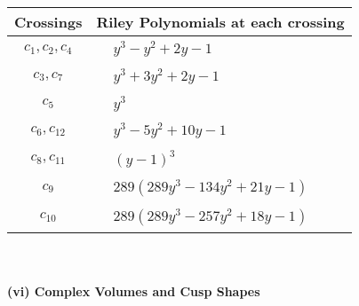 \documentclass[1p]{elsarticle_modified}
\theoremstyle{definition}
\begin{document}
\begin{tabular}{m{50pt}|m{274pt}}
Crossings & \hspace{64pt}Riley Polynomials at each crossing \\
\hline $$\begin{aligned}c_{1},c_{2},c_{4}\end{aligned}$$&$\begin{aligned}
&y^3- y^2+2 y-1
\end{aligned}$\\
\hline $$\begin{aligned}c_{3},c_{7}\end{aligned}$$&$\begin{aligned}
&y^3+3 y^2+2 y-1
\end{aligned}$\\
\hline $$\begin{aligned}c_{5}\end{aligned}$$&$\begin{aligned}
&y^3
\end{aligned}$\\
\hline $$\begin{aligned}c_{6},c_{12}\end{aligned}$$&$\begin{aligned}
&y^3-5 y^2+10 y-1
\end{aligned}$\\
\hline $$\begin{aligned}c_{8},c_{11}\end{aligned}$$&$\begin{aligned}
&(y-1)^3
\end{aligned}$\\
\hline $$\begin{aligned}c_{9}\end{aligned}$$&$\begin{aligned}
&289(289 y^3-134 y^2+21 y-1)
\end{aligned}$\\
\hline $$\begin{aligned}c_{10}\end{aligned}$$&$\begin{aligned}
&289(289 y^3-257 y^2+18 y-1)
\end{aligned}$\\
\hline
\end{tabular}\\~\\
\newpage\flushleft \textbf{(vi) Complex Volumes and Cusp Shapes}
\end{document}
